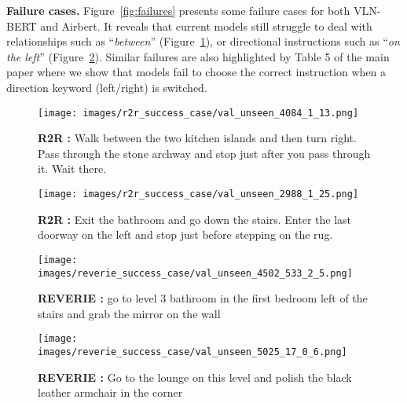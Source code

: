 \RequirePackage[dvipsnames,table]{xcolor} \documentclass[10pt,twocolumn,letterpaper]{article}
\newcommand{\p}[1]{\vspace{1mm}\noindent\textbf{#1}}
\newcommand{\vlnbert}{VLN-BERT}
\newcommand{\airbert}{Airbert}
\newcommand{\failure}{{\color{Bittersweet}{\ding{56}}}}
\begin{document}
\p{Failure cases.}
Figure~\ref{fig:failures} presents some failure cases for both \vlnbert{} and \airbert{}.
It reveals that current models still struggle to deal with relationships such as ``\emph{between}'' (Figure~\ref{fig:r2r-failure1}), or directional instructions such as ``\emph{on the left}'' (Figure~\ref{fig:r2r-failure2}).
Similar failures are also highlighted by Table 5 of the main paper where we show that models fail to choose the correct instruction when a direction keyword (left/right) is switched.

\begin{figure*}[t]
\centering 
\begin{subfigure}[b]{0.47\textwidth}
    \centering
    \texttt{[image: images/r2r\_success\_case/val\_unseen\_4084\_1\_13.png]} 
    \caption{\textbf{R2R \failure{}:} Walk between the two kitchen islands and then turn right. Pass through the stone archway and stop just after you pass through it. Wait there.}\label{fig:r2r-failure1}\end{subfigure}
\hfill
\begin{subfigure}[b]{0.47\textwidth}\centering
    \texttt{[image: images/r2r\_success\_case/val\_unseen\_2988\_1\_25.png]} 
    \caption{\textbf{R2R \failure{}:} Exit the bathroom and go down the stairs. Enter the last doorway on the left and stop just before stepping on the rug.}\label{fig:r2r-failure2}\end{subfigure}





\begin{subfigure}[b]{0.47\textwidth}\centering
    \texttt{[image: images/reverie\_success\_case/val\_unseen\_4502\_533\_2\_5.png]} 
    \caption{\textbf{REVERIE \failure{}:} go to level 3 bathroom in the first bedroom left of the stairs and grab the mirror on the wall}\label{fig:reverie-failure1}\end{subfigure} 
\hfill
\begin{subfigure}[b]{0.47\textwidth}\centering
    \texttt{[image: images/reverie\_success\_case/val\_unseen\_5025\_17\_0\_6.png]} 
    \caption{\textbf{REVERIE \failure{}:} Go to the lounge on this level and polish the black leather armchair in the corner}\label{fig:reverie-failure2}\end{subfigure} 
\caption{Failure cases for both \vlnbert~and \airbert~models.}
\label{fig:failures}
\end{figure*}
\end{document}

